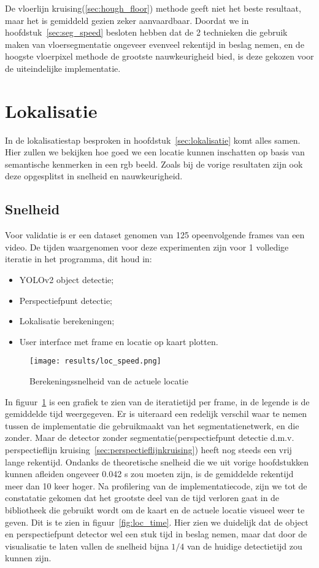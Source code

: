 De vloerlijn kruising(\ref{sec:hough_floor}) methode geeft niet het beste resultaat, maar het is gemiddeld gezien zeker aanvaardbaar.
Doordat we in hoofdstuk~\ref{sec:seg_speed} besloten hebben dat de 2 technieken die gebruik maken van vloersegmentatie ongeveer evenveel rekentijd in beslag
nemen, en de hoogste vloerpixel methode de grootste nauwkeurigheid bied, is deze gekozen voor de uiteindelijke implementatie.


\section{Lokalisatie}

In de lokalisatiestap besproken in hoofdstuk~\ref{sec:lokalisatie} komt alles samen.
Hier zullen we bekijken hoe goed we een locatie kunnen inschatten op basis van semantische kenmerken in een \gls{rgb} beeld.
Zoals bij de vorige resultaten zijn ook deze opgesplitst in snelheid en nauwkeurigheid.


\subsection{Snelheid}
Voor validatie is er een dataset genomen van 125 opeenvolgende frames van een video.
De tijden waargenomen voor deze experimenten zijn voor 1 volledige iteratie in het programma, dit houd in:

\begin{itemize}
    \item YOLOv2 object detectie;
    \item Perspectiefpunt detectie;
    \item Lokalisatie berekeningen;
    \item User interface met frame en locatie op kaart plotten.
\end{itemize}

\begin{figure}[h]
    \centering
    \texttt{[image: results/loc\_speed.png]}
    \caption{Berekeningssnelheid van de actuele locatie}
    \label{fig:loc_speed}
\end{figure}

In figuur~\ref{fig:loc_speed} is een grafiek te zien van de iteratietijd per frame, in de legende is de gemiddelde tijd weergegeven.
Er is uiteraard een redelijk verschil waar te nemen tussen de implementatie die gebruikmaakt van het segmentatienetwerk, en die zonder.
Maar de detector zonder segmentatie(perspectiefpunt detectie d.m.v. perspectieflijn kruising~\ref{sec:perspectieflijnkruising}) heeft nog steeds
een vrij lange rekentijd.
Ondanks de theoretische snelheid die we uit vorige hoofdstukken kunnen afleiden ongeveer 0.042 s zou moeten zijn, is de gemiddelde rekentijd meer dan 10 keer hoger.
Na profilering van de implementatiecode, zijn we tot de constatatie gekomen dat het grootste deel van de tijd verloren gaat in de bibliotheek die gebruikt wordt
om de kaart en de actuele locatie visueel weer te geven. Dit is te zien in figuur~\ref{fig:loc_time}.
Hier zien we duidelijk dat de object en perspectiefpunt detector wel een stuk tijd in beslag nemen, maar dat door de visualisatie te laten vallen
de snelheid bijna $1/4$ van de huidige detectietijd zou kunnen zijn.

